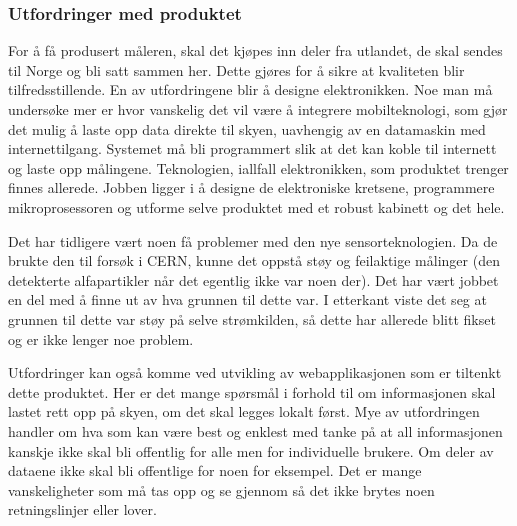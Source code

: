 \subsubsection{Utfordringer med produktet}

For å få produsert måleren, skal det kjøpes inn deler fra utlandet, de skal sendes til Norge og bli satt sammen her. Dette gjøres for å sikre at kvaliteten blir tilfredsstillende. En av utfordringene blir å designe elektronikken. Noe man må undersøke mer er hvor vanskelig det vil være å integrere mobilteknologi, som gjør det mulig å laste opp data direkte til skyen, uavhengig av en datamaskin med internettilgang. Systemet må bli programmert slik at det kan koble til internett og laste opp målingene. Teknologien, iallfall elektronikken, som produktet trenger finnes allerede. Jobben ligger i å designe de elektroniske kretsene, programmere mikroprosessoren og utforme selve produktet med et robust kabinett og det hele.

Det har tidligere vært noen få problemer med den nye sensorteknologien. Da de brukte den til forsøk i CERN, kunne det oppstå støy og feilaktige målinger (den detekterte alfapartikler når det egentlig ikke var noen der). Det har vært jobbet en del med å finne ut av hva grunnen til dette var. I etterkant viste det seg at grunnen til dette var støy på selve strømkilden, så dette har allerede blitt fikset og er ikke lenger noe problem.

Utfordringer kan også komme ved utvikling av webapplikasjonen som er tiltenkt dette produktet. Her er det mange spørsmål i forhold til om informasjonen skal lastet rett opp på skyen, om det skal legges lokalt først. Mye av utfordringen handler om hva som kan være best og enklest med tanke på at all informasjonen kanskje ikke skal bli offentlig for alle men for individuelle brukere. Om deler av dataene ikke skal bli offentlige for noen for eksempel. Det er mange vanskeligheter som må tas opp og se gjennom så det ikke brytes noen retningslinjer eller lover.
